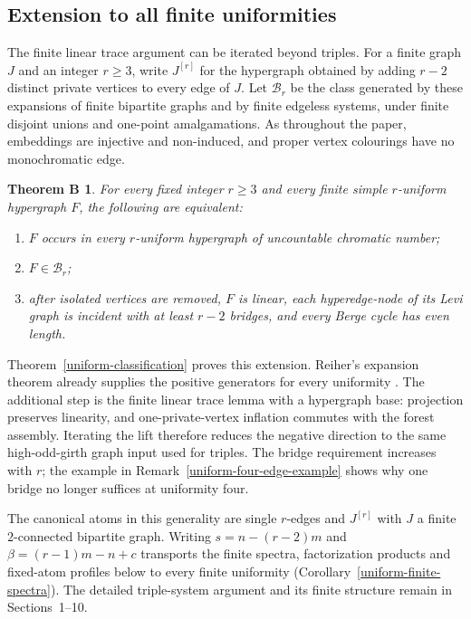 \documentclass[a4paper,11pt,reqno]{amsart}
\theoremstyle{plain}
\newtheorem*{theoremB}{Theorem B}
\theoremstyle{definition}
\theoremstyle{remark}
\begin{document}
\subsection*{Extension to all finite uniformities}
The finite linear trace argument can be iterated beyond triples.  For a
finite graph $J$ and an integer $r\ge3$, write $J^{[r]}$ for the hypergraph
obtained by adding $r-2$ distinct private vertices to every edge of $J$.
Let $\mathcal B_r$ be the class generated by these expansions of finite
bipartite graphs and by finite edgeless systems, under finite disjoint
unions and one-point amalgamations.  As throughout the paper, embeddings
are injective and non-induced, and proper vertex colourings have no
monochromatic edge.

\begin{theoremB}
For every fixed integer $r\ge3$ and every finite simple $r$-uniform
hypergraph $F$, the following are equivalent:
\begin{enumerate}
\item $F$ occurs in every $r$-uniform hypergraph of uncountable chromatic number;
\item $F\in\mathcal B_r$;
\item after isolated vertices are removed, $F$ is linear, each hyperedge-node
of its Levi graph is incident with at least $r-2$ bridges, and every
Berge cycle has even length.
\end{enumerate}
\end{theoremB}

Theorem~\ref{uniform-classification} proves this extension.  Reiher's
expansion theorem already supplies the positive generators for every
uniformity \citep[Theorem~1.2]{reiher2024}.  The additional step is the
finite linear trace lemma with a hypergraph base: projection preserves
linearity, and one-private-vertex inflation commutes with the forest
assembly.  Iterating the lift therefore reduces the negative direction to
the same high-odd-girth graph input used for triples.  The bridge
requirement increases with $r$; the example in
Remark~\ref{uniform-four-edge-example} shows why one bridge no longer
suffices at uniformity four.

The canonical atoms in this generality are single $r$-edges and
$J^{[r]}$ with $J$ a finite $2$-connected bipartite graph.  Writing
$s=n-(r-2)m$ and $\beta=(r-1)m-n+c$ transports the finite spectra,
factorization products and fixed-atom profiles below to every finite
uniformity (Corollary~\ref{uniform-finite-spectra}).  The detailed
triple-system argument and its finite structure remain in Sections~1--10.
\end{document}

